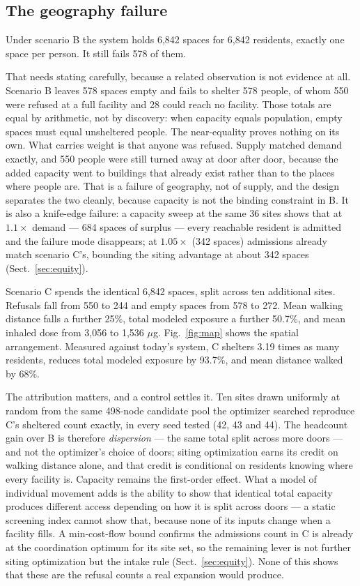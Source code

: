 \documentclass[graybox]{svmult}
\begin{document}
\subsection{The geography failure}
\label{sec:geography}

Under scenario B the system holds 6,842 spaces for 6,842 residents, exactly one
space per person. It still fails 578 of them.

That needs stating carefully, because a related observation is not evidence at
all. Scenario B leaves 578 spaces empty and fails to shelter 578 people, of
whom 550 were refused at a full facility and 28 could reach no facility. Those
totals are equal by arithmetic, not by discovery: when capacity equals
population, empty spaces must equal unsheltered people. The near-equality
proves nothing on its own. What carries weight is that anyone was refused.
Supply matched demand exactly, and 550 people were still turned away at door
after door, because the added capacity went to buildings that already exist
rather than to the places where people are. That is a failure of geography, not
of supply, and the design separates the two cleanly, because capacity is not
the binding constraint in B. It is also a knife-edge failure: a capacity sweep
at the same 36 sites shows that at $1.1\times$ demand --- 684 spaces of
surplus --- every reachable resident is admitted and the failure mode
disappears; at $1.05\times$ (342 spaces) admissions already match scenario
C's, bounding the siting advantage at about 342 spaces
(Sect.~\ref{sec:equity}).

Scenario C spends the identical 6,842 spaces, split across ten additional
sites. Refusals fall from 550 to 244 and empty spaces from 578 to 272. Mean
walking distance falls a further 25\%, total modeled exposure a further 50.7\%,
and mean inhaled dose from 3,056 to 1,536 $\mu$g. Fig.~\ref{fig:map} shows the
spatial arrangement. Measured against today's system, C shelters 3.19 times as
many residents, reduces total modeled exposure by 93.7\%, and mean distance
walked by 68\%.

The attribution matters, and a control settles it. Ten sites drawn uniformly at
random from the same 498-node candidate pool the optimizer searched reproduce
C's sheltered count exactly, in every seed tested (42, 43 and 44). The
headcount gain over B is
therefore \emph{dispersion} --- the same total split across more doors --- and
not the optimizer's choice of doors; siting optimization earns its credit on
walking distance alone, and that credit is conditional on residents knowing
where every facility is. Capacity remains the first-order effect. What a model
of individual movement adds is the ability to show that identical total
capacity produces different access depending on how it is split across doors
--- a static screening index cannot show that, because none of its inputs
change when a facility fills. A min-cost-flow bound confirms the admissions
count in C is already at the coordination optimum for its site set, so the
remaining lever is not further siting optimization but the intake rule
(Sect.~\ref{sec:equity}). None of this shows that these are the refusal counts
a real expansion would produce.
\end{document}
